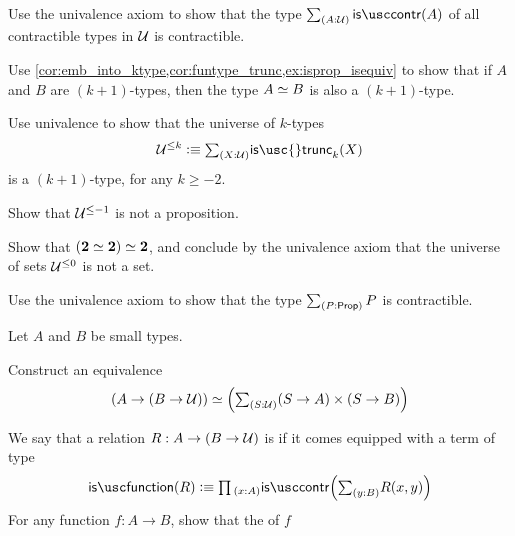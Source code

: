 \begin{exercises}
\item \label{ex:istrunc_UUtrunc}
\begin{subexenum}
\item Use the univalence axiom to show that the type $\sm{A:\UU}\iscontr(A)$ of all contractible types in $\mathcal{U}$ is contractible.
\item Use \cref{cor:emb_into_ktype,cor:funtype_trunc,ex:isprop_isequiv} to show that if $A$ and $B$ are $(k+1)$-types, then the type $\eqv{A}{B}$ is also a $(k+1)$-type.
\item Use univalence to show that the universe of $k$-types
\begin{equation*}
\UU^{\leq k}\defeq \sm{X:\UU}\mathsf{is\usc{}trunc}_k(X)
\end{equation*}
is a $(k+1)$-type, for any $k\geq -2$.
\item Show that $\mathcal{U}^{\leq-1}$ is not a proposition.
\item Show that $\eqv{(\eqv{\bool}{\bool})}{\bool}$, and conclude by the univalence axiom that the universe of sets $\mathcal{U}^{\leq 0}$ is not a set. 
\end{subexenum}
\item Use the univalence axiom to show that the type $\sm{P:\prop}P$ is contractible.
\item Let $A$ and $B$ be small types. 
\begin{subexenum}
\item Construct an equivalence
\begin{equation*}
\eqv{(A\to (B\to\UU))}{\Big(\sm{S:\UU} (S\to A)\times (S\to B)\Big)}
\end{equation*}
\item We say that a relation $R:A\to (B\to\mathcal{U})$ is  if it comes equipped with a term of type
\begin{equation*}
\isfunction(R) \defeq \prd{x:A}\iscontr\Big(\sm{y:B}R(x,y)\Big)
\end{equation*}
For any function $f:A\to B$, show that the  of $f$ 
\begin{equation*}

\end{equation*}
\end{subexenum}
\end{exercises}

